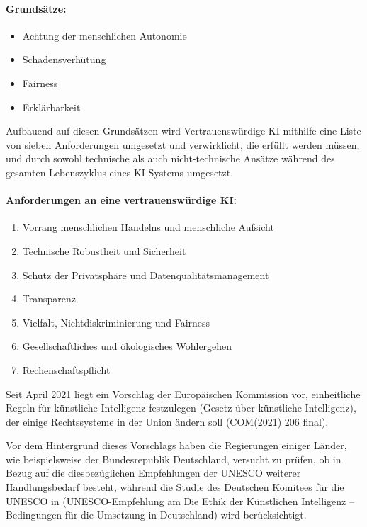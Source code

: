 \documentclass[12pt]{report}
\begin{document}
\paragraph{Grundsätze:}
\begin{itemize}
	\item  Achtung der menschlichen Autonomie
	\item  Schadensverhütung
	\item  Fairness
	\item  Erklärbarkeit
\end{itemize}

Aufbauend auf diesen Grundsätzen wird  Vertrauenswürdige KI mithilfe eine Liste von sieben Anforderungen umgesetzt und verwirklicht, die erfüllt werden müssen, und durch sowohl technische als auch nicht-technische Ansätze während des gesamten Lebenszyklus eines KI-Systems umgesetzt.

\paragraph{Anforderungen an eine vertrauenswürdige KI:}
\begin{enumerate}
	\item  Vorrang menschlichen Handelns und menschliche Aufsicht
	\item  Technische Robustheit und Sicherheit
	\item  Schutz der Privatsphäre und Datenqualitätsmanagement
	\item  Transparenz
	\item  Vielfalt, Nichtdiskriminierung und Fairness
	\item  Gesellschaftliches und ökologisches Wohlergehen
	\item  Rechenschaftspflicht
\end{enumerate}

Seit April 2021 liegt ein Vorschlag der Europäischen Kommission vor, einheitliche Regeln für künstliche Intelligenz festzulegen (Gesetz über künstliche Intelligenz), der einige Rechtssysteme in der Union ändern soll (COM(2021) 206 final).

Vor dem Hintergrund dieses Vorschlags haben die Regierungen einiger Länder, wie beispielsweise der Bundesrepublik Deutschland, versucht zu prüfen, ob in Bezug auf die diesbezüglichen Empfehlungen der UNESCO weiterer Handlungsbedarf besteht, während die Studie des Deutschen Komitees für die UNESCO in (UNESCO-Empfehlung am Die Ethik der Künstlichen Intelligenz – Bedingungen für die Umsetzung in Deutschland) wird berücksichtigt.\cite{Deutscher_Bundestag}
\end{document}
